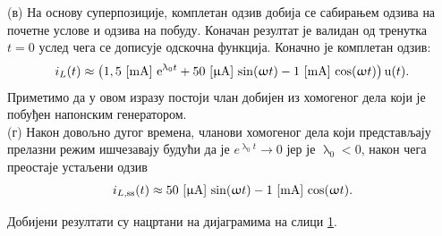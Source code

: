 \begin{figure}[b!]
    \caption{}
    \label{fig:\ID.2}
\end{figure}

(в) На основу суперпозиције, комплетан одзив добија се сабирањем одзива на почетне услове и 
одзива на побуду. Коначан резултат је валидан од тренутка $t=0$ услед чега 
се дописује одскочна функција. Коначно је комплетан одзив:
\begin{equation}
i_L(t) \approx
\bigl(1,5\,\left[\mathrm{mA}\right]\,{\rm e}^{\uplambda_0 t}
+
50 \,\left[\mathrm{\upmu A}\right]\, \sin(\upomega t) -
1\,\left[\mathrm{mA}\right]\,
\cos (\upomega t)
\bigr)
\,{\rm u}(t).
\end{equation}
Приметимо да у овом изразу постоји члан 
добијен из хомогеног дела који је 
побуђен напонским генератором.  \\

(г) Након довољно дугог времена, чланови хомогеног дела који представљају прелазни
режим ишчезавају будући да је 
$e^{\uplambda_0 t} \to 0$ јер је 
$\uplambda_0 < 0$, након чега 
преостаје устаљени одзив
\begin{equation}
i_{L,\rm ss}(t) \approx 
50 \,\left[\mathrm{\upmu A}\right]\, \sin(\upomega t) -
1\,\left[\mathrm{mA}\right]\,
\cos (\upomega t).
\end{equation}

\vspace*{1mm}
\noindent
Добијени резултати су нацртани на 
дијаграмима на слици \ref{fig:\ID.2}.


